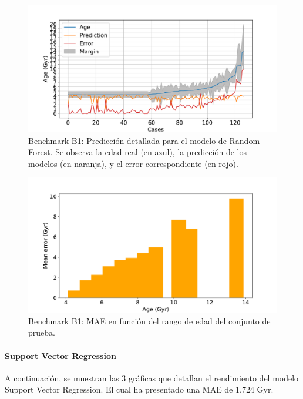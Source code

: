 \begin{figure}[H]
\begin{center}
 \includegraphics[width=0.8\linewidth]{Figuras/Experimentos/B_B1_rf_2.pdf}
\end{center}
\caption{Benchmark B1: Predicción detallada para el modelo de Random Forest. Se observa la edad real (en azul), la predicción de los modelos (en naranja), y el error correspondiente (en rojo).}
 \label{fig:benchB1_details_rf_2}
\end{figure}

\begin{figure}[H]
\begin{center}
 \includegraphics[width=0.8\linewidth]{Figuras/Experimentos/B_B1_rf_3.pdf}
\end{center}
\caption{Benchmark B1: MAE en función del rango de edad del conjunto de prueba.}
 \label{fig:benchB1_details_rf_3}
\end{figure}

\paragraph{Support Vector Regression} 
A continuación, se muestran las 3 gráficas que detallan el rendimiento del modelo Support Vector Regression. El cual ha presentado una MAE de 1.724 Gyr.

